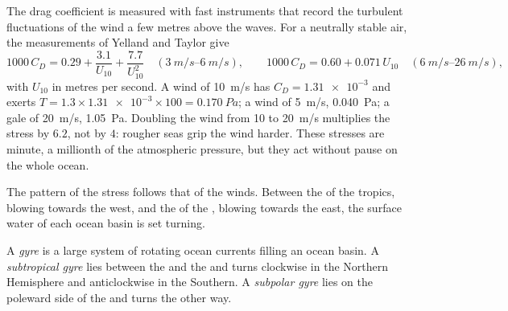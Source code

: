 The drag coefficient is measured with fast instruments that record the turbulent
fluctuations of the wind a few metres above the waves. For a neutrally stable air,
the measurements of Yelland and Taylor give
\[
  1000\,C_D = 0.29 + \frac{3.1}{U_{10}} + \frac{7.7}{U_{10}^2}
  \quad (\qtyrange{3}{6}{m/s}),
  \qquad
  1000\,C_D = 0.60 + 0.071\,U_{10}
  \quad (\qtyrange{6}{26}{m/s}),
\]
with $U_{10}$ in metres per second. A wind of \qty{10}{m/s} has $C_D =
\num{1.31e-3}$ and exerts $T = 1.3 \times \num{1.31e-3} \times 100 =
\qty{0.170}{Pa}$; a wind of \qty{5}{m/s}, \qty{0.040}{Pa}; a gale of
\qty{20}{m/s}, \qty{1.05}{Pa}. Doubling the wind from 10 to \qty{20}{m/s}
multiplies the stress by $6.2$, not by $4$: rougher seas grip the wind harder. These
stresses are minute, a millionth of the atmospheric pressure, but they act without
pause on the whole ocean.

The pattern of the stress follows that of the winds. Between the  of the
tropics, blowing towards the west, and the  of the , blowing
towards the east, the surface water of each ocean basin is set turning.

\begin{definition}\label{def:b1:ocean-circulation:gyre}
A \emph{gyre} is a large system of rotating ocean currents filling an
ocean basin. A \emph{subtropical gyre} lies between the  and the  and turns clockwise in the Northern Hemisphere and
anticlockwise in the Southern. A \emph{subpolar gyre} lies on
the poleward side of the  and turns the other way.
\end{definition}

